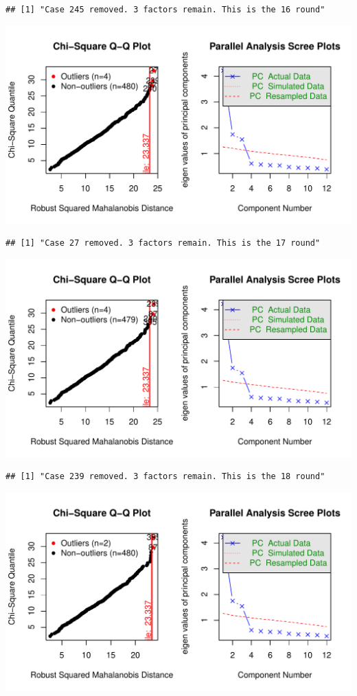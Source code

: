 \documentclass{article}\usepackage[]{graphicx}\usepackage[]{color}
\makeatletter
\def\maxwidth{ %
  \ifdim\Gin@nat@width>\linewidth
    \linewidth
  \else
    \Gin@nat@width
  \fi
}
\newenvironment{kframe}{%
 \def\at@end@of@kframe{}%
 \ifinner\ifhmode%
  \def\at@end@of@kframe{\end{minipage}}%
  \begin{minipage}{\columnwidth}%
 \fi\fi%
 \def\FrameCommand##1{\hskip\@totalleftmargin \hskip-\fboxsep
 \colorbox{shadecolor}{##1}\hskip-\fboxsep
     \hskip-\linewidth \hskip-\@totalleftmargin \hskip\columnwidth}%
 \MakeFramed {\advance\hsize-\width
   \@totalleftmargin\z@ \linewidth\hsize
   \@setminipage}}%
 {\par\unskip\endMakeFramed%
 \at@end@of@kframe}
\newenvironment{knitrout}{}{} %
\makeatother
\begin{document}
\begin{knitrout}
\begin{kframe}\begin{verbatim}
## [1] "Case 245 removed. 3 factors remain. This is the 16 round"
\end{verbatim}
\end{kframe}
\includegraphics[width=\maxwidth]{figure/unnamed-chunk-10-17} 
\begin{kframe}\begin{verbatim}
## [1] "Case 27 removed. 3 factors remain. This is the 17 round"
\end{verbatim}
\end{kframe}
\includegraphics[width=\maxwidth]{figure/unnamed-chunk-10-18} 
\begin{kframe}\begin{verbatim}
## [1] "Case 239 removed. 3 factors remain. This is the 18 round"
\end{verbatim}
\end{kframe}
\includegraphics[width=\maxwidth]{figure/unnamed-chunk-10-19} 

\end{knitrout}
\end{document}
